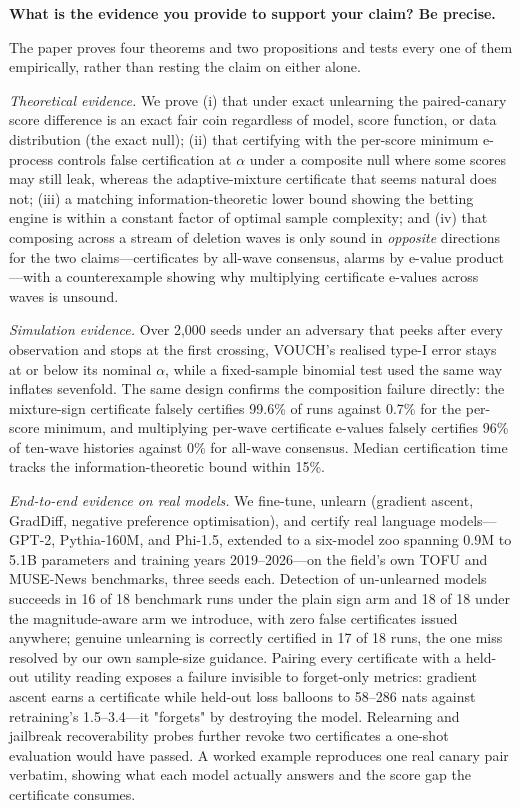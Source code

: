 \documentclass[10pt]{article}
\begin{document}
\vspace{2pt}
\noindent\textbf{What is the evidence you provide to support your claim? Be precise.}

The paper proves four theorems and two propositions and tests every one of them
empirically, rather than resting the claim on either alone.

\emph{Theoretical evidence.} We prove (i) that under exact unlearning the
paired-canary score difference is an exact fair coin regardless of model, score
function, or data distribution (the exact null); (ii) that certifying with the
per-score minimum e-process controls false certification at $\alpha$ under a
composite null where some scores may still leak, whereas the adaptive-mixture
certificate that seems natural does not; (iii) a matching information-theoretic
lower bound showing the betting engine is within a constant factor of optimal
sample complexity; and (iv) that composing across a stream of deletion waves is
only sound in \emph{opposite} directions for the two claims---certificates by
all-wave consensus, alarms by e-value product---with a counterexample showing why
multiplying certificate e-values across waves is unsound.

\emph{Simulation evidence.} Over 2{,}000 seeds under an adversary that peeks after
every observation and stops at the first crossing, VOUCH's realised type-I error
stays at or below its nominal $\alpha$, while a fixed-sample binomial test used the
same way inflates sevenfold. The same design confirms the composition failure
directly: the mixture-sign certificate falsely certifies 99.6\% of runs against
0.7\% for the per-score minimum, and multiplying per-wave certificate e-values
falsely certifies 96\% of ten-wave histories against 0\% for all-wave consensus.
Median certification time tracks the information-theoretic bound within 15\%.

\emph{End-to-end evidence on real models.} We fine-tune, unlearn (gradient ascent,
GradDiff, negative preference optimisation), and certify real language
models---GPT-2, Pythia-160M, and Phi-1.5, extended to a six-model zoo spanning 0.9M
to 5.1B parameters and training years 2019--2026---on the field's own TOFU and
MUSE-News benchmarks, three seeds each. Detection of un-unlearned models succeeds
in 16 of 18 benchmark runs under the plain sign arm and 18 of 18 under the
magnitude-aware arm we introduce, with zero false certificates issued anywhere;
genuine unlearning is correctly certified in 17 of 18 runs, the one miss resolved
by our own sample-size guidance. Pairing every certificate with a held-out utility
reading exposes a failure invisible to forget-only metrics: gradient ascent earns a
certificate while held-out loss balloons to 58--286 nats against retraining's
1.5--3.4---it "forgets" by destroying the model. Relearning and jailbreak
recoverability probes further revoke two certificates a one-shot evaluation would
have passed. A worked example reproduces one real canary pair verbatim, showing
what each model actually answers and the score gap the certificate consumes.
\end{document}

